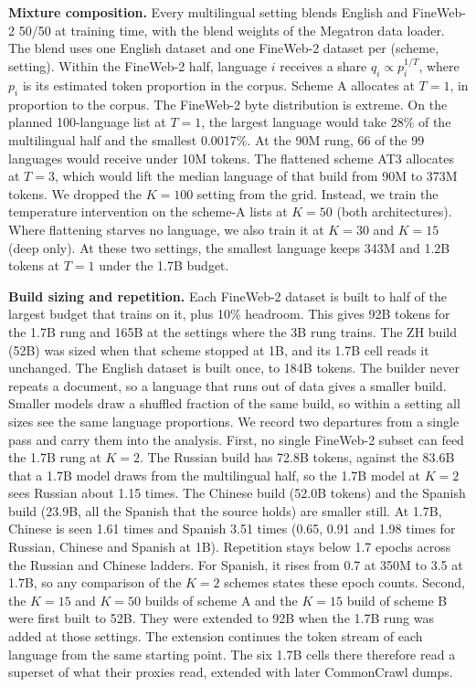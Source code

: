 \textbf{Mixture composition.} Every multilingual setting blends English and FineWeb-2 50/50 at training time, with the blend weights of the Megatron data loader. The blend uses one English dataset and one FineWeb-2 dataset per (scheme, setting). Within the FineWeb-2 half, language $i$ receives a share $q_i \propto p_i^{1/T}$, where $p_i$ is its estimated token proportion in the corpus. Scheme A allocates at $T=1$, in proportion to the corpus. The FineWeb-2 byte distribution is extreme. On the planned 100-language list at $T=1$, the largest language would take 28\% of the multilingual half and the smallest 0.0017\%. At the 90M rung, 66 of the 99 languages would receive under 10M tokens. The flattened scheme AT3 allocates at $T=3$, which would lift the median language of that build from 90M to 373M tokens. We dropped the $K=100$ setting from the grid. Instead, we train the temperature intervention on the scheme-A lists at $K=50$ (both architectures). Where flattening starves no language, we also train it at $K=30$ and $K=15$ (deep only). At these two settings, the smallest language keeps 343M and 1.2B tokens at $T=1$ under the 1.7B budget.

\textbf{Build sizing and repetition.} Each FineWeb-2 dataset is built to half of the largest budget that trains on it, plus 10\% headroom. This gives 92B tokens for the 1.7B rung and 165B at the settings where the 3B rung trains. The ZH build (52B) was sized when that scheme stopped at 1B, and its 1.7B cell reads it unchanged. The English dataset is built once, to 184B tokens. The builder never repeats a document, so a language that runs out of data gives a smaller build. Smaller models draw a shuffled fraction of the same build, so within a setting all sizes see the same language proportions. We record two departures from a single pass and carry them into the analysis. First, no single FineWeb-2 subset can feed the 1.7B rung at $K=2$. The Russian build has 72.8B tokens, against the 83.6B that a 1.7B model draws from the multilingual half, so the 1.7B model at $K=2$ sees Russian about 1.15 times. The Chinese build (52.0B tokens) and the Spanish build (23.9B, all the Spanish that the source holds) are smaller still. At 1.7B, Chinese is seen 1.61 times and Spanish 3.51 times (0.65, 0.91 and 1.98 times for Russian, Chinese and Spanish at 1B). Repetition stays below 1.7 epochs across the Russian and Chinese ladders. For Spanish, it rises from 0.7 at 350M to 3.5 at 1.7B, so any comparison of the $K=2$ schemes states these epoch counts. Second, the $K=15$ and $K=50$ builds of scheme A and the $K=15$ build of scheme B were first built to 52B. They were extended to 92B when the 1.7B rung was added at those settings. The extension continues the token stream of each language from the same starting point. The six 1.7B cells there therefore read a superset of what their proxies read, extended with later CommonCrawl dumps. %

